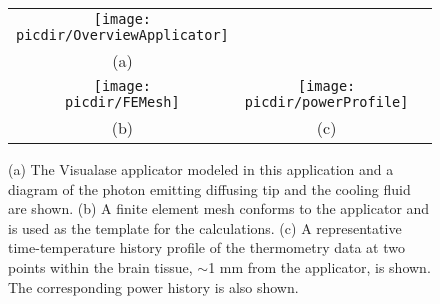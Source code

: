 \documentclass[12pt]{article}
\newif\iflatextortf
\newcommand{\picdir}{pdffig}
\begin{document}
\begin{figure*}[p!]
\centering
\iflatextortf 
\else
\begin{tabular}{ccc}
\scalebox{0.4}{\texttt{[image: \\picdir/OverviewApplicator]}} \\ 
(a)\\
\scalebox{0.18}{\texttt{[image: \\picdir/FEMesh]}}  
&
\scalebox{0.24}{\texttt{[image: \\picdir/powerProfile]}}  
\\
(b) & (c)  \\
\end{tabular}
\fi
\caption{
(a) The Visualase\textsuperscript{\textregistered} applicator modeled in
this application and a diagram of the photon emitting diffusing
tip and the cooling fluid  are shown. (b) A finite element mesh conforms to the applicator
and is used as the template for the calculations. (c) A representative
time-temperature history profile of the thermometry data at two points within the brain tissue,
 $\sim$1 mm from the applicator, is shown. The corresponding power history is also shown. 
} \label{LaserApplicatorOverview}
\end{figure*}
\end{document}
